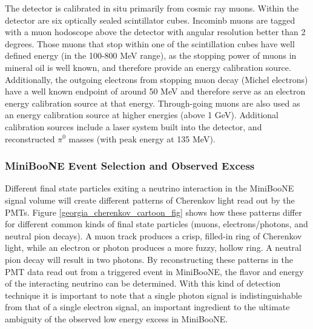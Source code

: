 The detector is calibrated in situ primarily from cosmic ray muons. Within the detector are six optically sealed scintillator cubes. Incominb muons are tagged with a muon hodoscope above the detector with angular resolution better than 2 degrees. Those muons that stop within one of the scintillation cubes have well defined energy (in the 100-800 MeV range), as the stopping power of muons in mineral oil is well known, and therefore provide an energy calibration source. Additionally, the outgoing electrons from stopping muon decay (Michel electrons) have a well known endpoint of around 50 MeV and therefore serve as an electron energy calibration source at that energy. Through-going muons are also used as an energy calibration source at higher energies (above 1 GeV). Additional calibration sources include a laser system built into the detector, and reconstructed $\pi^0$ masses (with peak energy at 135 MeV).

\subsubsection{MiniBooNE Event Selection and Observed Excess}

Different final state particles exiting a neutrino interaction in the MiniBooNE signal volume will create different patterns of Cherenkov light read out by the PMTs. Figure \ref{georgia_cherenkov_cartoon_fig} \cite{GeorgiaThesis} shows how these patterns differ for different common kinds of final state particles (muons, electrons/photons, and neutral pion decays). A muon track produces a crisp, filled-in ring of Cherenkov light, while an electron or photon produces a more fuzzy, hollow ring. A neutral pion decay will result in two photons. By reconstructing these patterns in the PMT data read out from a triggered event in MiniBooNE, the flavor and energy of the interacting neutrino can be determined. With this kind of detection technique it is important to note that a single photon signal is indistinguishable from that of a single electron signal, an important ingredient to the ultimate ambiguity of the observed low energy excess in MiniBooNE.\\

